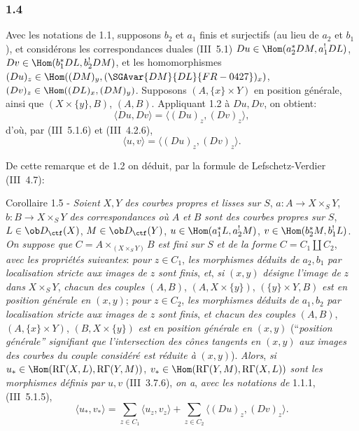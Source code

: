 \subsubsection*{1.4}
Avec les notations de 1.1, supposons $b_2$ et $a_1$ finis et surjectifs (au lieu de $a_2$ et $b_1$), et considérons les correspondances duales (III~5.1) $Du\in\Hom(a_2^*DM,a_1^!DL)$, $Dv\in\Hom(b_1^*DL,b_2^!DM)$, et les homomorphismes $(Du)_z\in\Hom((DM)_y,(\SGAvar{DM}{DL}{FR-0427})_x)$, $(Dv)_z\in\Hom((DL)_x,(DM)_y)$. Supposons $(A,\{x\}\times Y)$ en position générale, ainsi que $(X\times\{y\},B)$, $(A,B)$. Appliquant 1.2 à $Du,Dv$, on obtient:
\[
\langle Du,Dv\rangle=\langle (Du)_z,(Dv)_z\rangle,
\]
d'où, par (III~5.1.6) et (III~4.2.6),
\begin{equation}\tag{1.4.1}
\langle u,v\rangle=\langle (Du)_z,(Dv)_z\rangle.
\end{equation}

De
cette remarque et de 1.2 on déduit, par la formule de Lefschetz-Verdier (III~4.7):

\begin{statement}{Corollaire 1.5 -}
\emph{Soient} $X,Y$ \emph{des courbes propres et lisses sur} $S$, $a:A\longrightarrow X\times_S Y$, $b:B\longrightarrow X\times_S Y$ \emph{des correspondances où} $A$ \emph{et} $B$ \emph{sont des courbes propres sur} $S$, $L\in\ob D_{\ctf}(X)$, $M\in\ob D_{\ctf}(Y)$, $u\in\Hom(a_1^*L,a_2^!M)$, $v\in\Hom(b_2^*M,b_1^!L)$. \emph{On suppose que} $C=A\times_{(X\times_S Y)}B$ \emph{est fini sur} $S$ \emph{et de la forme} $C=C_1\amalg C_2$, \emph{avec les propriétés suivantes}: \emph{pour} $z\in C_1$, \emph{les morphismes déduits de} $a_2,b_1$ \emph{par localisation stricte aux images de} $z$ \emph{sont finis}, \emph{et}, \emph{si} $(x,y)$ \emph{désigne l'image de} $z$ \emph{dans} $X\times_S Y$, \emph{chacun des couples} $(A,B)$, $(A,X\times\{y\})$, $(\{y\}\times Y,B)$ \emph{est en position générale en} $(x,y)$; \emph{pour} $z\in C_2$, \emph{les morphismes déduits de} $a_1,b_2$ \emph{par localisation stricte aux images de} $z$ \emph{sont finis}, \emph{et chacun des couples} $(A,B)$, $(A,\{x\}\times Y)$, $(B,X\times\{y\})$ \emph{est en position générale en} $(x,y)$ (``\emph{position générale'' signifiant que l'intersection des cônes tangents en} $(x,y)$ \emph{aux images des courbes du couple considéré est réduite à} $(x,y)$). \emph{Alors}, \emph{si} $u_*\in\Hom(\mathrm{R}\Gamma(X,L),\mathrm{R}\Gamma(Y,M))$, $v_*\in\Hom(\mathrm{R}\Gamma(Y,M),\mathrm{R}\Gamma(X,L))$ \emph{sont les morphismes définis par} $u,v$ (III~3.7.6), \emph{on a}, \emph{avec les notations de} 1.1.1, (III~5.1.5),
\begin{equation}\tag{1.5.1}
\langle u_*,v_*\rangle=\sum_{z\in C_1}\langle u_z,v_z\rangle+\sum_{z\in C_2}\langle (Du)_z,(Dv)_z\rangle.
\end{equation}
\end{statement}

